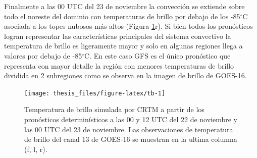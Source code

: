 \documentclass[12pt,oneside,a4paper]{reedthesis}
\begin{document}
Finalmente a las 00 UTC del 23 de noviembre la convección se extiende sobre todo el noreste del dominio con temperaturas de brillo por debajo de los -85\(^\circ\)C asociada a los topes nubosos más altos (Figura \ref{fig:tb}r). Si bien todos los pronósticos logran representar las características principales del sistema convectivo la temperatura de brillo es ligeramente mayor y solo en algunas regiones llega a valores por debajo de -85\(^\circ\)C. En este caso GFS es el único pronóstico que representa con mayor detalle la región con menores temperaturas de brillo dividida en 2 subregiones como se observa en la imagen de brillo de GOES-16.


\begin{figure}

{\centering \texttt{[image: thesis\_files/figure-latex/tb-1]} 

}

\caption{Temperatura de brillo simulada por CRTM a partir de los pronósticos determinísticos a las 00 y 12 UTC del 22 de noviembre y las 00 UTC del 23 de noviembre. Las observaciones de temperatura de brillo del canal 13 de GOES-16 se muestran en la ultima columna (f, l, r).}\label{fig:tb}
\end{figure}
\end{document}
